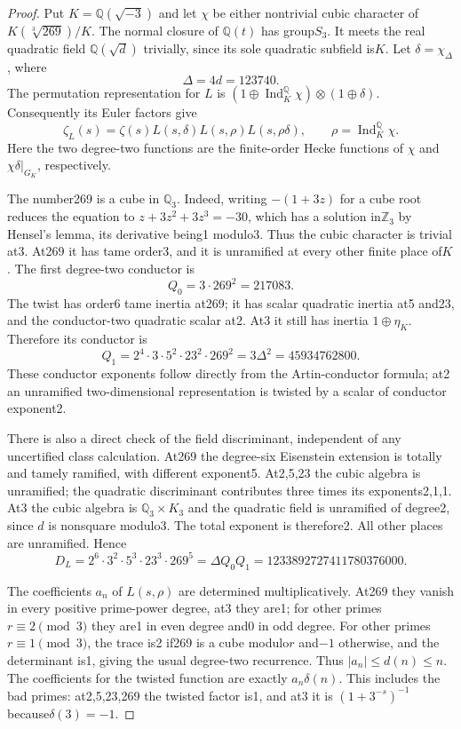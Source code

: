 \begin{proof}
Put $K=\mathbb Q(\sqrt{-3})$ and let $\chi$ be either nontrivial cubic
character of $K(\sqrt[3]{269})/K$.
The normal closure of $\mathbb Q(t)$ has group$S_3$.
It meets the real quadratic field $\mathbb Q(\sqrt d)$ trivially,
since its sole quadratic subfield is$K$.
Let $\delta=\chi_\Delta$, where
\[
                  \Delta=4d=123740.
\]
The permutation representation for $L$ is
$(1\oplus\operatorname{Ind}_K^{\mathbb Q}\chi)\otimes(1\oplus\delta)$.
Consequently its Euler factors give
\[
 \zeta_L(s)=\zeta(s)L(s,\delta)L(s,\rho)L(s,\rho\delta),
 \qquad \rho=\operatorname{Ind}_K^{\mathbb Q}\chi.
\]
Here the two degree-two functions are the finite-order Hecke functions
of $\chi$ and $\chi\delta|_{G_K}$, respectively.

The number269 is a cube in $\mathbb Q_3$.  Indeed, writing
$-(1+3z)$ for a cube root reduces the equation to
$z+3z^2+3z^3=-30$, which has a solution in$\mathbb Z_3$ by
Hensel's lemma, its derivative being1 modulo3.
Thus the cubic character is trivial at3.  At269 it has tame order3,
and it is unramified at every other finite place of$K$.
The first degree-two conductor is
\[
                    Q_0=3\cdot269^2=217083.
\]
The twist has order6 tame inertia at269; it has scalar quadratic inertia
at5 and23, and the conductor-two quadratic scalar at2.
At3 it still has inertia $1\oplus\eta_K$.
Therefore its conductor is
\[
                  Q_1=2^4\cdot3\cdot5^2\cdot23^2\cdot269^2
                      =3\Delta^2=45934762800.
\]
These conductor exponents follow directly from the Artin-conductor
formula; at2 an unramified two-dimensional representation is twisted by
a scalar of conductor exponent2.

There is also a direct check of the field discriminant, independent of
any uncertified class calculation.  At269 the degree-six Eisenstein
extension is totally and tamely ramified, with different exponent5.
At2,5,23 the cubic algebra is unramified; the quadratic discriminant
contributes three times its exponents2,1,1.
At3 the cubic algebra is $\mathbb Q_3\times K_3$ and the quadratic field
is unramified of degree2, since $d$ is nonsquare modulo3.
The total exponent is therefore2.  All other places are unramified.
Hence
\[
 D_L=2^6\cdot3^2\cdot5^3\cdot23^3\cdot269^5
     =\Delta Q_0Q_1=1233892727411780376000.
\]

The coefficients $a_n$ of $L(s,\rho)$ are determined multiplicatively.
At269 they vanish in every positive prime-power degree, at3 they are1;
for other primes $r\equiv2\pmod3$ they are1 in even degree and0 in odd degree.
For other primes $r\equiv1\pmod3$, the trace is2 if269 is a cube modulo$r$ and$-1$
otherwise, and the determinant is1, giving the usual degree-two recurrence.
Thus $|a_n|\le d(n)\le n$.
The coefficients for the twisted function are exactly $a_n\delta(n)$.
This includes the bad primes: at2,5,23,269 the twisted factor is1,
and at3 it is $(1+3^{-s})^{-1}$ because$\delta(3)=-1$.


\end{proof}
